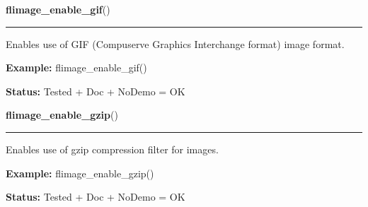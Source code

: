     \vspace{0.5ex}

\hspace{.8\funcindent}\begin{boxedminipage}{\funcwidth}

    \raggedright \textbf{flimage\_enable\_gif}()

    \vspace{-1.5ex}

    \rule{\textwidth}{0.5\fboxrule}
\setlength{\parskip}{2ex}
    Enables use of GIF (Compuserve Graphics Interchange format) image 
    format.

\setlength{\parskip}{1ex}
\textbf{Example:} flimage\_enable\_gif()



\textbf{Status:} Tested + Doc + NoDemo = OK



    \end{boxedminipage}

    \label{xformslib:flflimage:flimage_enable_gzip}

    \vspace{0.5ex}

\hspace{.8\funcindent}\begin{boxedminipage}{\funcwidth}

    \raggedright \textbf{flimage\_enable\_gzip}()

    \vspace{-1.5ex}

    \rule{\textwidth}{0.5\fboxrule}
\setlength{\parskip}{2ex}
    Enables use of gzip compression filter for images.

\setlength{\parskip}{1ex}
\textbf{Example:} flimage\_enable\_gzip()



\textbf{Status:} Tested + Doc + NoDemo = OK



    \end{boxedminipage}

    \label{xformslib:flflimage:flimage_enable_jpeg}

    \vspace{0.5ex}


